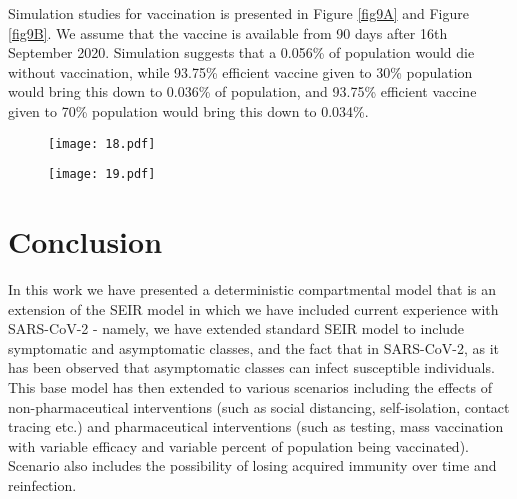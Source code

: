 \documentclass[10pt]{wlscirep}
\begin{document}
Simulation studies for vaccination is presented in Figure \ref{fig9A} and Figure \ref{fig9B}. We assume that the vaccine is available from 90 days after 16th September 2020. Simulation suggests that a 0.056\% of population would die without vaccination, while 93.75\% efficient vaccine given to 30\% population would bring this down to 0.036\% of population, and 93.75\% efficient vaccine given to 70\% population would bring this down to 0.034\%.
%
%
\begin{figure*}[!htb]
	\centering
	\begin{subfigure}[b]{0.7\textwidth}
		\centering
		\texttt{[image: 18.pdf]}
	\end{subfigure}
	\caption{Sensitivity of vaccine efficiency parameter $(1-\phi)$, where $\phi = 0$ represents vaccine that offers $100\%$ protection against infection, and $\xi_{\max} = 0.3$, i.e. maximum of 30\% population is administered with vaccine. $\phi$ is varied from 1.0 (No vaccination), 0.5 (50\% efficient), 0.25 (75\% efficient), 0.125(87.5\% efficient), and 0.0625 (93.75\% efficient) (India)}
	\label{fig9A} 
\end{figure*}
%
%
\begin{figure*}[!htb]
	\centering
	\begin{subfigure}[b]{0.7\textwidth}
		\centering
		\texttt{[image: 19.pdf]}
	\end{subfigure}
	\caption{Sensitivity of vaccine efficiency parameter $(1-\phi)$, where $\phi = 0$ represents vaccine that offers $100\%$ protection against infection, and $\xi_{\max} = 0.7$, i.e. maximum of 70\% population is administered with vaccine. $\phi$ is varied from 1.0 (No vaccination), 0.5 (50\% efficient), 0.25 (75\% efficient), 0.125(87.5\% efficient), and 0.0625 (93.75\% efficient) (India)}
	\label{fig9B} 
\end{figure*}
%
%
\section*{Conclusion}
In this work we have presented a deterministic compartmental model that is an extension of the SEIR model in which we have included current experience with SARS-CoV-2 - namely, we have extended standard SEIR model to include symptomatic and asymptomatic classes, and the fact that in SARS-CoV-2, as it has been observed that asymptomatic classes can infect susceptible individuals. This base model has then extended to various scenarios including the effects of non-pharmaceutical interventions (such as social distancing, self-isolation, contact tracing etc.) and pharmaceutical interventions (such as testing, mass vaccination with variable efficacy and variable percent of population being vaccinated). Scenario also includes the possibility of losing acquired immunity over time and reinfection.  
\end{document}
